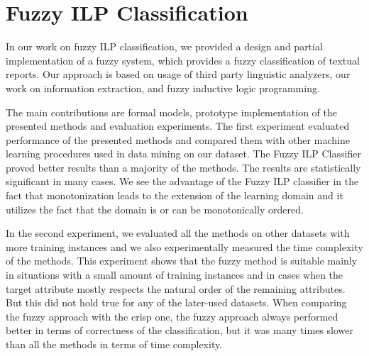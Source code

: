 


\section{Fuzzy ILP Classification} \label{sec:conclusion}


In our work on fuzzy ILP classification, we provided a design and partial implementation of a fuzzy system, which provides a fuzzy classification of textual reports. Our approach is based on usage of third party linguistic analyzers, our work on information extraction, and fuzzy inductive logic programming.

The main contributions are formal models, prototype implementation of the presented methods and evaluation experiments. The first experiment evaluated performance of the presented methods and compared them with other machine learning procedures used in data mining on our dataset. The Fuzzy ILP Classifier proved better results than a majority of the methods. The results are statistically significant in many cases. 
We see the advantage of the Fuzzy ILP classifier in the fact that monotonization leads to the extension of the learning domain and it utilizes the fact that the domain is or can be monotonically ordered.

In the second experiment, we evaluated all the methods on other datasets with more training instances and we also experimentally measured the time complexity of the methods. This experiment shows that the fuzzy method is suitable mainly in situations with a small amount of training instances and in cases when the target attribute mostly respects the natural order of the remaining attributes. But this did not hold true for any of the later-used datasets. When comparing the fuzzy approach with the crisp one, the fuzzy approach always performed better in terms of correctness of the classification, but it was many times slower than all the methods in terms of time complexity.



